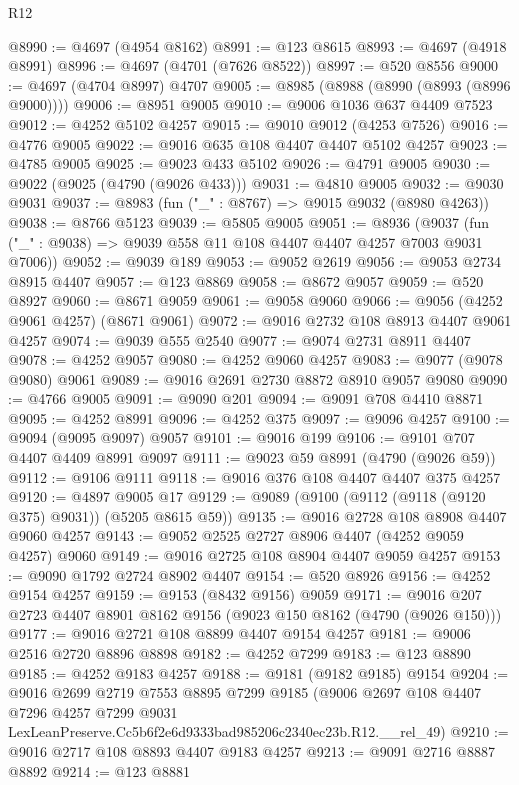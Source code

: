 \begin{lexlean}{R12}
\begin{coremodule}
@8990 := @4697 (@4954 @8162)
@8991 := @123 @8615
@8993 := @4697 (@4918 @8991)
@8996 := @4697 (@4701 (@7626 @8522))
@8997 := @520 @8556
@9000 := @4697 (@4704 @8997) @4707
@9005 := @8985 (@8988 (@8990 (@8993 (@8996 @9000))))
@9006 := @8951 @9005
@9010 := @9006 @1036 @637 @4409 @7523
@9012 := @4252 @5102 @4257
@9015 := @9010 @9012 (@4253 @7526)
@9016 := @4776 @9005
@9022 := @9016 @635 @108 @4407 @4407 @5102 @4257
@9023 := @4785 @9005
@9025 := @9023 @433 @5102
@9026 := @4791 @9005
@9030 := @9022 (@9025 (@4790 (@9026 @433)))
@9031 := @4810 @9005
@9032 := @9030 @9031
@9037 := @8983 (fun ("_" : @8767) => @9015 @9032 (@8980 @4263))
@9038 := @8766 @5123
@9039 := @5805 @9005
@9051 := @8936
    (@9037 (fun ("_" : @9038) => @9039 @558 @11 @108 @4407 @4407 @4257 @7003 @9031 @7006))
@9052 := @9039 @189
@9053 := @9052 @2619
@9056 := @9053 @2734 @8915 @4407
@9057 := @123 @8869
@9058 := @8672 @9057
@9059 := @520 @8927
@9060 := @8671 @9059
@9061 := @9058 @9060
@9066 := @9056 (@4252 @9061 @4257) (@8671 @9061)
@9072 := @9016 @2732 @108 @8913 @4407 @9061 @4257
@9074 := @9039 @555 @2540
@9077 := @9074 @2731 @8911 @4407
@9078 := @4252 @9057
@9080 := @4252 @9060 @4257
@9083 := @9077 (@9078 @9080) @9061
@9089 := @9016 @2691 @2730 @8872 @8910 @9057 @9080
@9090 := @4766 @9005
@9091 := @9090 @201
@9094 := @9091 @708 @4410 @8871
@9095 := @4252 @8991
@9096 := @4252 @375
@9097 := @9096 @4257
@9100 := @9094 (@9095 @9097) @9057
@9101 := @9016 @199
@9106 := @9101 @707 @4407 @4409 @8991 @9097
@9111 := @9023 @59 @8991 (@4790 (@9026 @59))
@9112 := @9106 @9111
@9118 := @9016 @376 @108 @4407 @4407 @375 @4257
@9120 := @4897 @9005 @17
@9129 := @9089 (@9100 (@9112 (@9118 (@9120 @375) @9031)) (@5205 @8615 @59))
@9135 := @9016 @2728 @108 @8908 @4407 @9060 @4257
@9143 := @9052 @2525 @2727 @8906 @4407 (@4252 @9059 @4257) @9060
@9149 := @9016 @2725 @108 @8904 @4407 @9059 @4257
@9153 := @9090 @1792 @2724 @8902 @4407
@9154 := @520 @8926
@9156 := @4252 @9154 @4257
@9159 := @9153 (@8432 @9156) @9059
@9171 := @9016 @207 @2723 @4407 @8901 @8162 @9156 (@9023 @150 @8162 (@4790 (@9026 @150)))
@9177 := @9016 @2721 @108 @8899 @4407 @9154 @4257
@9181 := @9006 @2516 @2720 @8896 @8898
@9182 := @4252 @7299
@9183 := @123 @8890
@9185 := @4252 @9183 @4257
@9188 := @9181 (@9182 @9185) @9154
@9204 := @9016
    @2699
    @2719
    @7553
    @8895
    @7299
    @9185
    (@9006
      @2697
      @108
      @4407
      @7296
      @4257
      @7299
      @9031
      LexLeanPreserve.Cc5b6f2e6d9333bad985206c2340ec23b.R12.__rel_49)
@9210 := @9016 @2717 @108 @8893 @4407 @9183 @4257
@9213 := @9091 @2716 @8887 @8892
@9214 := @123 @8881

\end{coremodule}
\end{lexlean}
